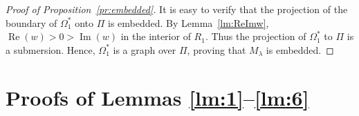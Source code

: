 \documentclass[11pt]{amsart}
\newcommand{\R}{\mathbb{R}}
\renewcommand{\Re}{\operatorname{Re}}
\renewcommand{\Im}{\operatorname{Im}}
\numberwithin{equation}{section}
\numberwithin{figure}{section}
\theoremstyle{plain} %
\theoremstyle{definition} %
\begin{document}
\begin{proof}[Proof of Proposition~\ref{pr:embedded}]
It is easy to verify that the projection of the boundary of $\Omega_1^*$ onto $\Pi$ is embedded.  
By Lemma~\ref{lm:ReImw}, $\Re(w)>0>\Im(w)$ in the interior of $R_1$.  
Thus the projection of $\Omega_1^*$ to $\Pi$ is a submersion.  
Hence, $\Omega_1^*$ is a graph over $\Pi$, proving that $M_{\lambda}$ is embedded.
%
%
\end{proof}

\appendix

\section{Proofs of Lemmas \ref{lm:1}--\ref{lm:6}}
\end{document}
